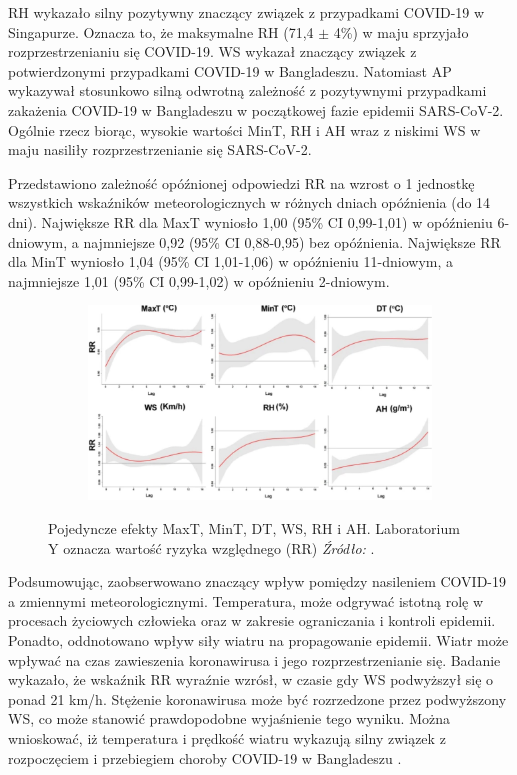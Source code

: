 \documentclass[polish, twoside, 12pt, a4paper]{article}
\theoremstyle{definition}
\theoremstyle{plain}
\theoremstyle{remark}
\begin{document}
RH wykazało silny pozytywny znaczący związek z przypadkami COVID-19 w Singapurze. Oznacza to, że maksymalne RH (71,4 $\pm$ 4\%) w maju sprzyjało rozprzestrzenianiu się COVID-19. WS wykazał znaczący związek z potwierdzonymi przypadkami COVID-19 w Bangladeszu. Natomiast AP wykazywał stosunkowo silną odwrotną zależność z pozytywnymi przypadkami zakażenia COVID-19 w Bangladeszu w początkowej fazie epidemii SARS-CoV-2. Ogólnie rzecz biorąc, wysokie wartości MinT, RH i AH wraz z niskimi WS w maju nasiliły rozprzestrzenianie się SARS-CoV-2.

Przedstawiono zależność opóźnionej odpowiedzi RR na wzrost o 1 jednostkę wszystkich wskaźników meteorologicznych w różnych dniach opóźnienia (do 14 dni). Największe RR dla MaxT wyniosło 1,00 (95\% CI 0,99-1,01) w opóźnieniu 6-dniowym, a najmniejsze 0,92 (95\% CI 0,88-0,95) bez opóźnienia. Największe RR dla MinT wyniosło 1,04 (95\% CI 1,01-1,06) w opóźnieniu 11-dniowym, a najmniejsze 1,01 (95\% CI 0,99-1,02) w opóźnieniu 2-dniowym. 


\begin{figure}[H]
  \centering

  \begin{subfigure}[t]{\textwidth}
    \includegraphics[width=15cm]{clmate-factors.jpg}
  \end{subfigure}

  \captionsetup{margin=10pt,font=small,labelfont=bf,width=.8\textwidth}

  \caption{Pojedyncze efekty MaxT, MinT, DT, WS, RH i AH. Laboratorium Y oznacza wartość ryzyka względnego (RR) \textit{Źródło:} \cite{hasanuzzaman2020}.}\label{fig:xxx3}
\end{figure}


Podsumowując, zaobserwowano znaczący wpływ pomiędzy nasileniem COVID-19 a zmiennymi meteorologicznymi. Temperatura, może odgrywać istotną rolę w procesach życiowych człowieka oraz w zakresie ograniczania i kontroli epidemii. Ponadto, oddnotowano wpływ siły wiatru na propagowanie epidemii. Wiatr może wpływać na czas zawieszenia koronawirusa i jego rozprzestrzenianie się. Badanie wykazało, że wskaźnik RR wyraźnie wzrósł, w czasie gdy WS podwyższył się o ponad 21 km/h. Stężenie koronawirusa może być rozrzedzone przez podwyższony WS, co może stanowić prawdopodobne wyjaśnienie tego wyniku. Można wnioskować, iż temperatura i prędkość wiatru wykazują silny związek z rozpoczęciem i przebiegiem choroby COVID-19 w Bangladeszu \cite{hasanuzzaman2020}.
\end{document}
